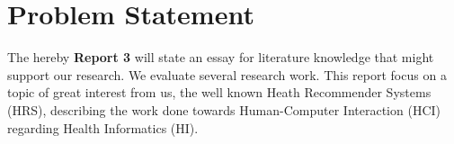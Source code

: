 \section{Problem Statement}

The hereby \textbf{Report 3} will state an essay for literature knowledge that might support our research. We evaluate several research work. This report focus on a topic of great interest from us, the well known Heath Recommender Systems (HRS), describing the work done towards Human-Computer Interaction (HCI) regarding Health Informatics (HI).